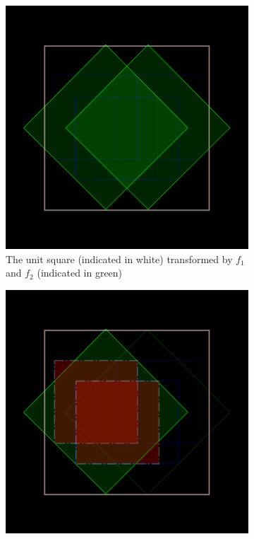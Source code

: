 \documentclass[11pt]{article}
\begin{document}
\begin{enumerate}
\begin{figure}
     \centering
     \begin{subfigure}[b]{0.4\textwidth}
         \centering
         \includegraphics[width=\textwidth]{figures/dragon_curve_a}
         \caption{The unit square (indicated in white) transformed by $f_1$ and $f_2$ (indicated in green)}
         \label{figure:dragon_curve_a}
         \vspace*{5mm}
     \end{subfigure}
     \hfill
     \begin{subfigure}[b]{0.4\textwidth}
         \centering
         \includegraphics[width=\textwidth]{figures/dragon_curve_b}

\end{subfigure}
\end{figure}
\end{enumerate}
\end{document}
